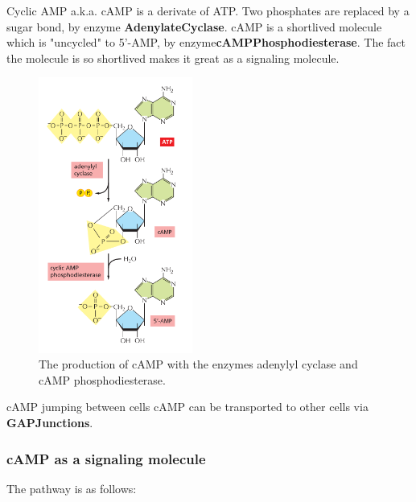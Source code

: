 \documentclass[../main.tex]{subfiles}
\begin{document}
Cyclic AMP a.k.a. \gls{cAMP} is a derivate of ATP. Two phosphates are replaced by a sugar bond, by enzyme \textbf{\gls{AdenylateCyclase}}. cAMP is a shortlived molecule which is "uncycled" to 5'-AMP, by enzyme\textbf{\gls{cAMPPhosphodiesterase}}. The fact the molecule is so shortlived makes it great as a signaling molecule.
\begin{figure}[H]
	\centering
	\includegraphics[width=0.45\textwidth]{cAMP_prod}
	\caption{The production of cAMP with the enzymes adenylyl cyclase and cAMP phosphodiesterase.}
\end{figure}

\begin{RemarkWithTitel}{cAMP jumping between cells}
	cAMP can be transported to other cells via \textbf{\gls{GAPJunctions}}.
\end{RemarkWithTitel}
\subsubsection{cAMP as a signaling molecule}

The pathway is as follows:
\end{document}
